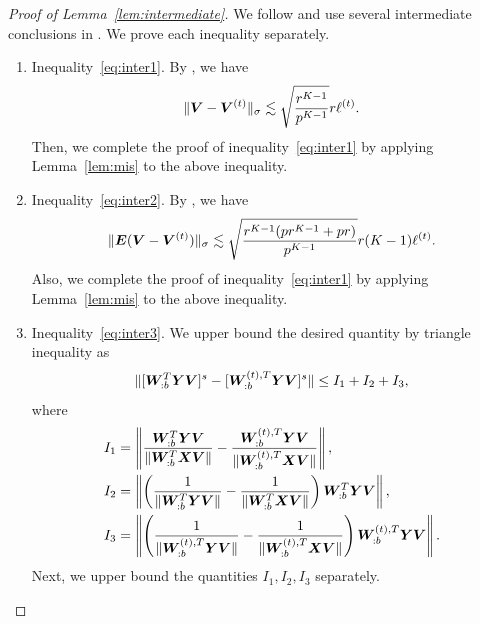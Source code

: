 \documentclass[lettersize,onecolumn,journal]{IEEEtran}
\theoremstyle{definition}
\theoremstyle{definition}
\newcommand{\of}[1]{\left(#1\right)}
\begin{document}
    \begin{proof}[Proof of Lemma~\ref{lem:intermediate}] We follow and use several intermediate conclusions in \citet[Proof of Lemma 5]{han2020exact}. We prove each inequality separately.
    \begin{enumerate}
    \item Inequality~\eqref{eq:inter1}. By \citet[Proof of Lemma 5]{han2020exact}, we have 
    \begin{equation}
         \lVert\bm{V} - \bm{V}^{(t)}\rVert_{\sigma} \lesssim \sqrt{\frac{r^{K-1}}{p^{K-1}}} r \ell^{(t)}.
    \end{equation}
    Then, we complete the proof of inequality~\eqref{eq:inter1} by applying Lemma~\ref{lem:mis} to the above inequality.
    \item Inequality~\eqref{eq:inter2}. By \citet[Proof of Lemma 5]{han2020exact}, we have 
    \begin{equation}
           \lVert\bm{E} (\bm{V} - \bm{V}^{(t)})\rVert_{\sigma} \lesssim \sqrt{ \frac{r^{K-1}(p r^{K-1} + p r)}{p^{K-1}}} r(K-1) \ell^{(t)}.
    \end{equation}
    Also, we complete the proof of inequality~\eqref{eq:inter1} by applying Lemma~\ref{lem:mis} to the above inequality.
    
    \item Inequality~\eqref{eq:inter3}. We upper bound the desired quantity by triangle inequality as
    \begin{equation}
        \lVert [ \bm{W}_{:b}^T \bm Y \bm{V} ]^s   -  [ \bm{W}_{:b}^{(t), T} \bm Y \bm{V}  ]^s \rVert \leq I_1 + I_2 + I_3,
    \end{equation}
    where 
    \begin{align}
        I_1 &=  \onorm{ \frac{ \mW_{:b}^T \mY \mV  }{\onormSize{}{  \mW_{:b}^T \mX \mV }} - \frac{ \mW_{:b}^{(t), T} \mY \mV  }{ \onormSize{}{\mW_{:b}^{(t), T} \mX \mV }}   },\\
        I_2 & = \onorm{\of{ \frac{1}{\onormSize{}{\mW_{:b}^T \mY \mV}} -  \frac{1}{\onormSize{}{\mW_{:b}^T \mX \mV}}  } \mW_{:b}^T \mY \mV },\\
        I_3 &= \onorm{\of{ \frac{1}{\onormSize{}{\mW_{:b}^{(t), T} \mY \mV  }} -  \frac{1}{\onormSize{}{\mW_{:b}^{(t), T} \mX \mV  }}  } \mW_{:b}^{(t), T} \mY \mV }.
    \end{align}
    Next, we upper bound the quantities $I_1, I_2, I_3$ separately. 
    

\end{enumerate}
\end{proof}
\end{document}
